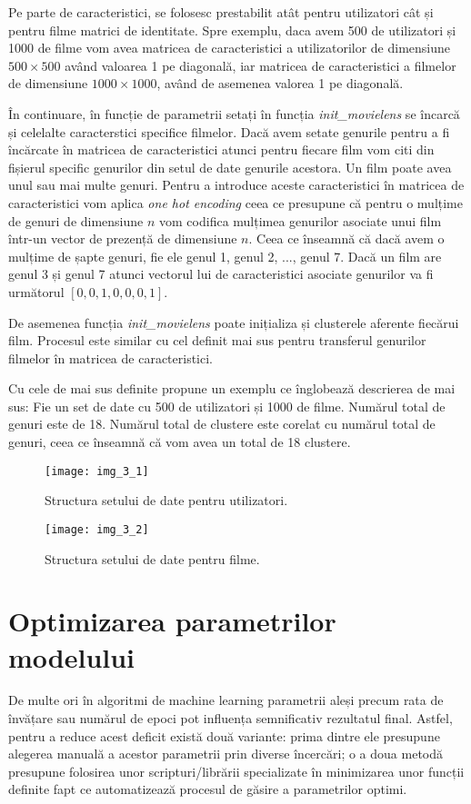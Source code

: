 Pe parte de caracteristici, se folosesc prestabilit atât pentru utilizatori cât și pentru filme matrici de identitate. Spre exemplu, daca avem 500 de utilizatori și 1000 de filme vom avea matricea de caracteristici a utilizatorilor de dimensiune $500 \times 500$ având valoarea 1 pe diagonală, iar matricea de caracteristici a filmelor de dimensiune $1000 \times 1000$, având de asemenea valorea 1 pe diagonală.

În continuare, în funcție de parametrii setați în funcția \textit{init\_movielens} se încarcă și celelalte caracterstici specifice filmelor. Dacă avem setate genurile pentru a fi încărcate în matricea de caracteristici atunci pentru fiecare film vom citi din fișierul specific genurilor din setul de date genurile acestora. Un film poate avea unul sau mai multe genuri. Pentru a introduce aceste caracteristici în matricea de caracteristici vom aplica \textit{one hot encoding} ceea ce presupune că pentru o mulțime de genuri de dimensiune $n$ vom codifica mulțimea genurilor asociate unui film într-un vector de prezență de dimensiune $n$. Ceea ce înseamnă că dacă avem o mulțime de șapte genuri, fie ele genul 1, genul 2, ..., genul 7. Dacă un film are genul 3 și genul 7 atunci vectorul lui de caracteristici asociate genurilor va fi următorul $[0, 0, 1, 0, 0, 0, 1]$.

De asemenea funcția \textit{init\_movielens} poate inițializa și clusterele aferente fiecărui film. Procesul este similar cu cel definit mai sus pentru transferul genurilor filmelor în matricea de caracteristici.

Cu cele de mai sus definite propune un exemplu ce înglobează descrierea de mai sus:
Fie un set de date cu 500 de utilizatori și 1000 de filme. Numărul total de genuri este de 18. Numărul total de clustere este corelat cu numărul total de genuri, ceea ce înseamnă că vom avea un total de 18 clustere.
\begin{figure}[!h]
	\centering
	\texttt{[image: img\_3\_1]}
	\caption[Structura setului de date pentru utilizatori]{Structura setului de date pentru utilizatori.}
\end{figure} 

\begin{figure}[!h]
	\centering
	\texttt{[image: img\_3\_2]}
	\caption[Structura setului de date pentru filme]{Structura setului de date pentru filme.}
\end{figure} 

\section{Optimizarea parametrilor modelului}
De multe ori în algoritmi de machine learning parametrii aleși precum rata de învățare sau numărul de epoci pot influența semnificativ rezultatul final. Astfel, pentru a reduce acest deficit există două variante: prima dintre ele presupune alegerea manuală a acestor parametrii prin diverse încercări; o a doua metodă presupune folosirea unor scripturi/librării specializate în minimizarea unor funcții definite fapt ce automatizează procesul de găsire a parametrilor optimi.


